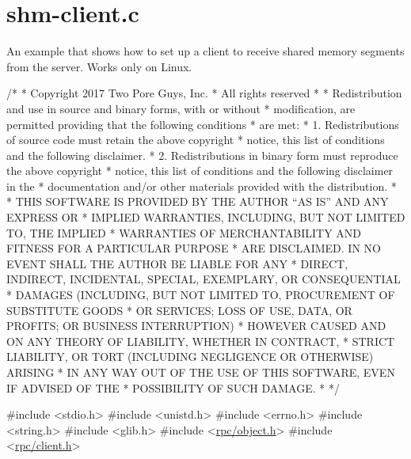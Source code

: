 \hypertarget{shm-client_8c-example}{}\section{shm-\/client.\+c}
An example that shows how to set up a client to receive shared memory segments from the server. Works only on Linux.


\begin{DoxyCodeInclude}
\textcolor{comment}{/*}
\textcolor{comment}{ * Copyright 2017 Two Pore Guys, Inc.}
\textcolor{comment}{ * All rights reserved}
\textcolor{comment}{ *}
\textcolor{comment}{ * Redistribution and use in source and binary forms, with or without}
\textcolor{comment}{ * modification, are permitted providing that the following conditions}
\textcolor{comment}{ * are met:}
\textcolor{comment}{ * 1. Redistributions of source code must retain the above copyright}
\textcolor{comment}{ *    notice, this list of conditions and the following disclaimer.}
\textcolor{comment}{ * 2. Redistributions in binary form must reproduce the above copyright}
\textcolor{comment}{ *    notice, this list of conditions and the following disclaimer in the}
\textcolor{comment}{ *    documentation and/or other materials provided with the distribution.}
\textcolor{comment}{ *}
\textcolor{comment}{ * THIS SOFTWARE IS PROVIDED BY THE AUTHOR ``AS IS'' AND ANY EXPRESS OR}
\textcolor{comment}{ * IMPLIED WARRANTIES, INCLUDING, BUT NOT LIMITED TO, THE IMPLIED}
\textcolor{comment}{ * WARRANTIES OF MERCHANTABILITY AND FITNESS FOR A PARTICULAR PURPOSE}
\textcolor{comment}{ * ARE DISCLAIMED.  IN NO EVENT SHALL THE AUTHOR BE LIABLE FOR ANY}
\textcolor{comment}{ * DIRECT, INDIRECT, INCIDENTAL, SPECIAL, EXEMPLARY, OR CONSEQUENTIAL}
\textcolor{comment}{ * DAMAGES (INCLUDING, BUT NOT LIMITED TO, PROCUREMENT OF SUBSTITUTE GOODS}
\textcolor{comment}{ * OR SERVICES; LOSS OF USE, DATA, OR PROFITS; OR BUSINESS INTERRUPTION)}
\textcolor{comment}{ * HOWEVER CAUSED AND ON ANY THEORY OF LIABILITY, WHETHER IN CONTRACT,}
\textcolor{comment}{ * STRICT LIABILITY, OR TORT (INCLUDING NEGLIGENCE OR OTHERWISE) ARISING}
\textcolor{comment}{ * IN ANY WAY OUT OF THE USE OF THIS SOFTWARE, EVEN IF ADVISED OF THE}
\textcolor{comment}{ * POSSIBILITY OF SUCH DAMAGE.}
\textcolor{comment}{ *}
\textcolor{comment}{ */}

\textcolor{preprocessor}{#include <stdio.h>}
\textcolor{preprocessor}{#include <unistd.h>}
\textcolor{preprocessor}{#include <errno.h>}
\textcolor{preprocessor}{#include <string.h>}
\textcolor{preprocessor}{#include <glib.h>}
\textcolor{preprocessor}{#include <\hyperlink{object_8h}{rpc/object.h}>}
\textcolor{preprocessor}{#include <\hyperlink{client_8h}{rpc/client.h}>}


\end{DoxyCodeInclude}
